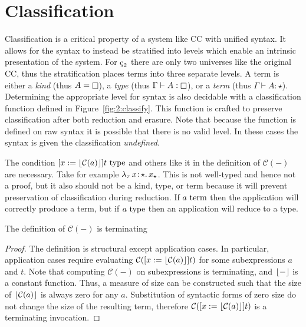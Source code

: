 \section{Classification}



Classification is a critical property of a system like CC with unified syntax.
It allows for the syntax to instead be stratified into levels which enable an intrinsic presentation of the system.
For $\ced$ there are only two universes like the original CC, thus the stratification places terms into three separate levels.
A term is either a \textit{kind} (thus $A = \kind$), a \textit{type} (thus $\Gamma \vdash A : \kind$), or a \textit{term} (thus $\Gamma \vdash A : \star$).
Determining the appropriate level for syntax is also decidable with a classification function defined in Figure~\ref{fig:2:classify}.
This function is crafted to preserve classification after both reduction and erasure.
Note that because the function is defined on raw syntax it is possible that there is no valid level.
In these cases the syntax is given the classification \textit{undefined}.

The condition $[x := \lfloor \mathcal{C}(a) \rfloor]t~\textnormal{type}$ and others like it in the definition of $\mathcal{C}(-)$ are necessary.
Take for example ${\lambda_\tau}\, x\! : \! \star.\, x_\star$.
This is not well-typed and hence not a proof, but it also should not be a kind, type, or term because it will prevent preservation of classification during reduction.
If $a~\textnormal{term}$ then the application will correctly produce a term, but if $a~\textnormal{type}$ then an application will reduce to a type.

\begin{lemma}
    The definition of $\mathcal{C}(-)$ is terminating
\end{lemma}
\begin{proof}
    The definition is structural except application cases.
    In particular, application cases require evaluating $\mathcal{C}([x := \lfloor \mathcal{C}(a) \rfloor]t)$ for some subexpressions $a$ and $t$.
    Note that computing $\mathcal{C}(-)$ on subexpressions is terminating, and $\lfloor - \rfloor$ is a constant function.
    Thus, a measure of size can be constructed such that the size of $\lfloor \mathcal{C}(a) \rfloor$ is always zero for any $a$.
    Substitution of syntactic forms of zero size do not change the size of the resulting term, therefore $\mathcal{C}([x := \lfloor \mathcal{C}(a) \rfloor]t)$ is a terminating invocation.
\end{proof}

